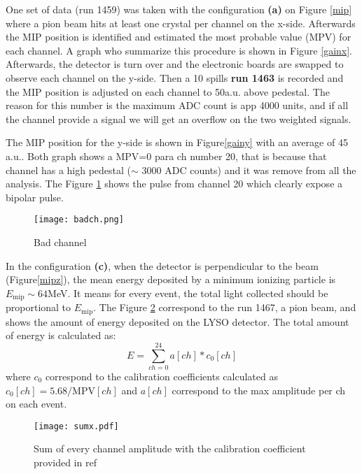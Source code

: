 One set of data (run 1459) was taken with the configuration {\bf(a)} on Figure \ref{mip} where a pion beam hits at least
one crystal per channel on the x-side. Afterwards the MIP position is identified and estimated the most probable value
(MPV) for each channel. A graph who summarize this procedure is shown in Figure \ref{gainx}. Afterwards, the detector is
turn over and the electronic boards are swapped to observe each channel on the y-side. Then a 10 spills {\bf run 1463} is
recorded and the MIP position is adjusted on each channel to 50a.u. above pedestal. The reason for this number is the
maximum ADC count is app 4000 units, and if all the channel provide a signal we will get an overflow on the two weighted
signals.\par The MIP position for the y-side is shown in Figure\ref{gainy} with an average of 45 a.u.. Both graph shows
a MPV=0 para ch number 20, that is because that channel has a high pedestal ($\sim$ 3000 ADC counts) and it was remove
from all the analysis. The Figure \ref{badch} shows the pulse from channel 20 which clearly expose a bipolar pulse. \par

\begin{figure}[ht]
	\hspace*{\fill}
	\centering
	\texttt{[image: badch.png]}
	\hspace*{\fill}
	\caption{Bad channel}\label{badch}
\end{figure}

In the configuration {\bf (c)}, when the detector is perpendicular to the beam (Figure\ref{mipz}), the mean energy
deposited by a minimum ionizing particle is $E_{\mathrm{mip}}\sim 64$MeV. It means for every event, the total light
collected should be proportional to $E_{\mathrm{mip}}$. The Figure \ref{sumx} correspond to the run 1467, a pion beam,
and shows the amount of energy deposited on the LYSO detector. The total amount of energy is calculated as:
\begin{equation}
E=\sum_{ch=0}^{24} a[ch]*c_0[ch]
\end{equation}
where $c_0$ correspond to the calibration coefficients calculated as $c_0[ch]=5.68/\mathrm{MPV}[ch]$ and $a[ch]$
correspond to the max amplitude per ch on each event.\par


\begin{figure}[ht]
	\hspace*{\fill}
	\centering
	\texttt{[image: sumx.pdf]}
	\hspace*{\fill}
	\caption{Sum of every channel amplitude with the calibration coefficient provided in ref{}}\label{sumx}
\end{figure}

